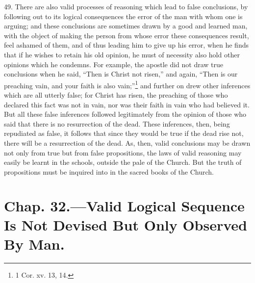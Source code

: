 49. There are also valid processes of reasoning which lead to false
conclusions, by following out to its logical consequences the error of
the man with whom one is arguing; and these conclusions are sometimes
drawn by a good and learned man, with the object of making the person
from whose error these consequences result, feel ashamed of them, and
of thus leading him to give up his error, when he finds that if he
wishes to retain his old opinion, he must of necessity also hold other
opinions which he condemns. For example, the apostle did not draw true
conclusions when he said, ``Then is Christ not risen,'' and again,
``Then is our preaching vain, and your faith is also
vain;''\footnote{1 Cor. xv. 13, 14.} and further on drew other
inferences which are all utterly false; for Christ has risen, the
preaching of those who declared this fact was not in vain, nor was
their faith in vain who had believed it. But all these false
inferences followed legitimately from the opinion of those who said
that there is no resurrection of the dead. These inferences, then,
being repudiated as false, it follows that since they would be true if
the dead rise not, there will be a resurrection of the dead. As, then,
valid conclusions may be drawn not only from true but from false
propositions, the laws of valid reasoning may easily be learnt in the
schools, outside the pale of the Church. But the truth of propositions
must be inquired into in the sacred books of the Church.

\section*{Chap. 32.\smaller---Valid Logical Sequence Is Not Devised
But Only Observed By Man.}

